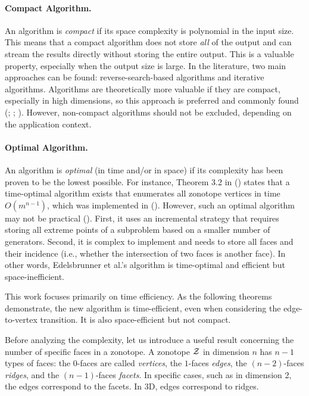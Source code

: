 \paragraph*{Compact Algorithm.} An algorithm is \emph{compact} if its space complexity is polynomial in the input size. This means that a compact algorithm does not store \emph{all} of the output and can stream the results directly without storing the entire output. This is a valuable property, especially when the output size is large. In the literature, two main approaches can be found: reverse-search-based algorithms and iterative algorithms. Algorithms are theoretically more valuable if they are compact, especially in high dimensions, so this approach is preferred and commonly found (\cite{avisPivotingAlgorithmConvex}; \cite{guCounterfactualIdentificationLatent2022}; \cite{radaNewAlgorithmEnumeration2018}). However, non-compact algorithms should not be excluded, depending on the application context.

\paragraph*{Optimal Algorithm.} An algorithm is \emph{optimal} (in time and/or in space) if its complexity has been proven to be the lowest possible. For instance, Theorem 3.2 in (\cite{ferrezSolvingFixedRank2005a}) states that a time-optimal algorithm exists that enumerates all zonotope vertices in time $O(m^{n-1})$, which was implemented in (\cite{edelsbrunnerConstructingArrangementsLines1983}). However, such an optimal algorithm may not be practical (\cite{ferrezSolvingFixedRank2005a}). First, it uses an incremental strategy that requires storing all extreme points of a subproblem based on a smaller number of generators. Second, it is complex to implement and needs to store all faces and their incidence (i.e., whether the intersection of two faces is another face). In other words, Edelsbrunner et al.'s algorithm is time-optimal and efficient but space-inefficient.

This work focuses primarily on time efficiency. As the following theorems demonstrate, the new algorithm is time-efficient, even when considering the edge-to-vertex transition. It is also space-efficient but not compact.

Before analyzing the complexity, let us introduce a useful result concerning the number of specific faces in a zonotope. A zonotope $\mathcal{Z}$ in dimension $n$ has $n-1$ types of faces: the $0$-faces are called \emph{vertices}, the $1$-faces \emph{edges}, the $(n-2)$-faces \emph{ridges}, and the $(n-1)$-faces \emph{facets}. In specific cases, such as in dimension 2, the edges correspond to the facets. In 3D, edges correspond to ridges.

